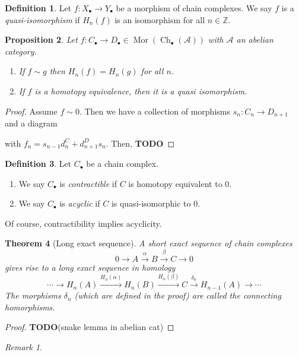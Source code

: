\documentclass{article}
\newcommand{\Z}{\mathbb{Z}}
\newcommand{\Acat}{\mathcal{A}}
\DeclareMathOperator{\Ch}{Ch}
\DeclareMathOperator{\Mor}{Mor}
\newcommand{\todo}{\textbf{TODO}}
\theoremstyle{plain}
\newtheorem{theorem}{Theorem}[section]
\newtheorem{proposition}[theorem]{Proposition}
\theoremstyle{definition}
\newtheorem{definition}[theorem]{Definition}
\theoremstyle{remark}
\newtheorem*{remark}{Remark}
\begin{document}
\begin{definition}
    Let $f : X_\bullet \to Y_\bullet$ be a morphism of chain complexes. We say $f$ is a \emph{quasi-isomorphism} if $H_n(f)$ is an isomorphism for all $n \in \Z$.
\end{definition}

\begin{proposition}
    Let $f : C_\bullet \to D_\bullet \in \Mor(\Ch_\bullet (\Acat))$ with $\Acat$ an abelian category.
    \begin{enumerate}
        \item If $f \sim g$ then $H_n(f) = H_n(g)$ for all $n$.
        \item If $f$ is a homotopy equivalence, then it is a quasi isomorphism.
    \end{enumerate}
\end{proposition}

\begin{proof}
    Assume $f \sim 0$. Then we have a collection of morphisms $s_n : C_n \to D_{n+1}$ and a diagram
    \begin{center}
    \end{center}
    with $f_n = s_{n-1} d_n^C + d_{n+1}^D s_n$. Then, \todo
\end{proof}

\begin{definition}
    Let $C_\bullet$ be a chain complex.
    \begin{enumerate}
        \item We say $C_\bullet$ is \emph{contractible} if $C$ is homotopy equivalent to $0$.
        \item We say $C_\bullet$ is \emph{acyclic} if $C$ is quasi-isomorphic to $0$.
    \end{enumerate}
\end{definition}

Of course, contractibility implies acyclicity.

\begin{theorem}[Long exact sequence]
    A short exact sequence of chain complexes
    \[0 \to A \xrightarrow{\alpha} B \xrightarrow{\beta} C \to 0\]
    gives rise to a long exact sequence in homology
    \[\cdots \to H_n(A) \xrightarrow{H_n (\alpha)} H_n(B) \xrightarrow{H_n(\beta)} C \xrightarrow{\delta_n} H_{n-1}(A) \to \cdots\]
    The morphisms $\delta_n$ (which are defined in the proof) are called the \emph{connecting} homorphisms.
\end{theorem}

\begin{proof}
    \todo (snake lemma in abelian cat)
\end{proof}

\begin{remark}
    
\end{remark}
\end{document}
